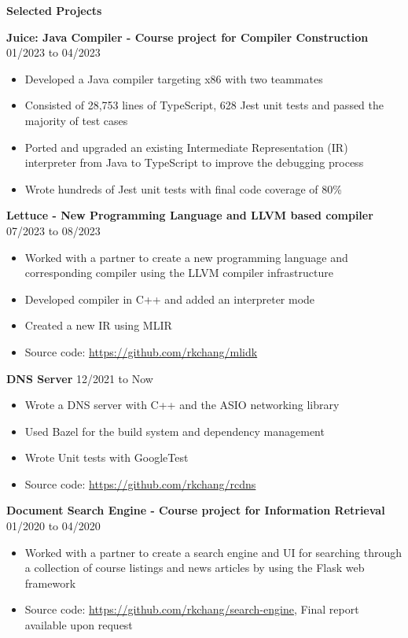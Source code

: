 \documentclass[10pt]{article}
\begin{document}
{\Large\textbf{Selected Projects}}\space \hrulefill

\textbf{Juice: Java Compiler - Course project for Compiler Construction} \hfill 01/2023 to 04/2023
\begin{itemize}[noitemsep]
    \item Developed a Java compiler targeting x86 with two teammates
    \item Consisted of 28,753 lines of TypeScript, 628 Jest unit tests and passed the majority of test cases
    \item Ported and upgraded an existing Intermediate Representation (IR) interpreter from Java to TypeScript to improve the debugging process
    \item Wrote hundreds of Jest unit tests with final code coverage of 80\%
\end{itemize}

\newpage

\textbf{Lettuce - New Programming Language and LLVM based compiler} \hfill 07/2023 to 08/2023
\begin{itemize}[noitemsep]
    \item Worked with a partner to create a new programming language and corresponding compiler using the LLVM compiler infrastructure
    \item Developed compiler in C++ and added an interpreter mode
    \item Created a new IR using MLIR
    \item Source code: \url{https://github.com/rkchang/mlidk}
\end{itemize}

\textbf{DNS Server} \hfill 12/2021 to Now
\begin{itemize}[noitemsep]
    \item Wrote a DNS server with C++ and the ASIO networking library
    \item Used Bazel for the build system and dependency management
    \item Wrote Unit tests with GoogleTest
    \item Source code: \url{https://github.com/rkchang/rcdns}
\end{itemize}

\textbf{Document Search Engine - Course project for Information Retrieval} \hfill 01/2020 to 04/2020
\begin{itemize}[noitemsep]
    \item Worked with a partner to create a search engine and UI for searching through a collection of course listings and news articles by using the Flask web framework
    \item Source code: \url{https://github.com/rkchang/search-engine}, Final report available upon request
\end{itemize}
\end{document}
